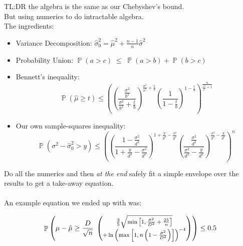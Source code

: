 \documentclass{beamer}
\DeclareMathOperator{\p}{\mathbb{P}}
\begin{document}
\begin{frame}
TL:DR the algebra is the same as our Chebyshev's bound.\\ But using numerics to do intractable algebra.\\
The ingredients:
\begin{itemize}
\item Variance Decomposition:
$ \hat{\sigma}_0^2=\hat{\mu}^2+\frac{n-1}{n}\hat{\sigma}^2 $
\item Probability Union:
$\p(a>c) \; \le \; \p(a>b) + \p(b>c)$
\item Bennett's inequality:
\begin{equation*}\label{eq_no2}\p(\hat{\mu}\ge t)\le 
\left(\left(\frac{\frac{\sigma^2}{b^2}}{\frac{\sigma^2}{b^2}+\frac{t}{b}}\right)^{\frac{\sigma^2}{b^2}+\frac{t}{b}}
\left(\frac{1}{1-\frac{t}{b}}\right)^{1-\frac{t}{b}}\right)^{\frac{n}{\frac{\sigma^2}{b^2}+1}}
\end{equation*}
\item Our own sample-squares inequality:
\begin{equation*}\p(\sigma^2 - \hat{\sigma}_0^2> y) \le \left(
\left(\frac{1-\frac{\sigma^2}{d^2}}{1+\frac{y}{d^2}-\frac{\sigma^2}{d^2}}\right)^{1+\frac{y}{d^2}-\frac{\sigma^2}{d^2}}
\left(\frac{\frac{\sigma^2}{d^2}}{\frac{\sigma^2}{d^2}-\frac{y}{d^2}}\right)^{\frac{\sigma^2}{d^2}-\frac{y}{d^2}}
\right)^n
\end{equation*}
\end{itemize}
\end{frame}

\begin{frame}

Do all the numerics and then \textit{at the end} safely fit a simple envelope over the results to get a take-away equation.\\
\-\hspace{1cm}\\ An example equation we ended up with was:
 
\begin{equation*}\label{eq:prob_bound} \p\left(\mu-\hat{\mu}\ge \frac{D}{\sqrt{n}}\; 
\footnotesize
\left(\begin{matrix*}[c]
\frac{3}{5}\sqrt{\min\left[1,\frac{\hat{\sigma}^2}{D^2}+\frac{25}{n}\right]} \\+ \ln\left(\max\left[1,n\left(1-\frac{\hat{\sigma}^2}{D^2}\right)\right]\right)^{-4}\end{matrix*}
\normalsize
\right)\right) 
\le 0.5 \end{equation*}
\end{frame}
\end{document}
